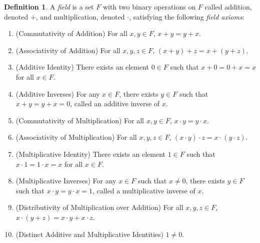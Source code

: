 \documentclass[11pt]{article}
\theoremstyle{definition}
\newtheorem{definition}[theorem]{Definition}
\numberwithin{equation}{subsection}
\begin{document}
\begin{definition}
	A \emph{field} is a set $F$ with two binary operations  on $F$ called addition, denoted $+$, and multiplication, denoted $\cdot$\;, satisfying the following \emph{field axioms}:
	\begin{enumerate}[{FA}1]
		\item  (Commutativity of Addition)  For all $x,y\in F$, $x + y = y + x$.
		\item  (Associativity of Addition)  For all $x,y,z\in F$, $(x + y) + z = x + (y + z)$.
		\item  (Additive Identity)  There exists an element $0 \in F$ such that $x + 0 = 0 + x = x$ for all $x \in F$.
		\item  (Additive Inverses)  For any $x \in F$, there exists $y \in F$ such that $x + y = y + x = 0$,  called an additive inverse of $x$.
		\item  (Commutativity of Multiplication)  For all $x,y\in F$, $x \cdot y = y \cdot x$.
		\item  (Associativity of Multiplication)  For all $x, y, z \in F$, $(x \cdot y) \cdot z = x \cdot (y \cdot z)$.
		\item  (Multiplicative Identity)  There exists an element $1 \in F$ such that $x \cdot 1 = 1 \cdot x = x$ for all $x \in F$.
		\item  (Multiplicative Inverses)  For any $x \in F$ such that $x \neq 0$, there exists $y \in F$ such that $x \cdot y = y \cdot x = 1$,  called a multiplicative inverse of $x$.
		\item  (Distributivity of Multiplication over Addition)  For all $x, y, z \in F$,
		$x \cdot(y + z) = x \cdot y + x \cdot z$. 
		\item  (Distinct Additive and Multiplicative Identities)  $1 \neq 0$.
\end{enumerate}

\end{definition}
\end{document}
